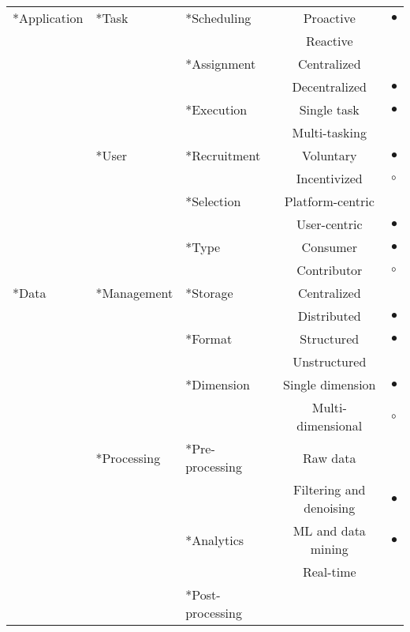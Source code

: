 \begin{table}[htbp]
\renewcommand{\arraystretch}{0.85}
\scriptsize
\centering
\begin{tabularx}{\textwidth}{
    >{\centering\arraybackslash}X
    >{\centering\arraybackslash}X
    >{\centering\arraybackslash}X
    c
    >{\centering\arraybackslash}X}
\toprule
\multirow{12}*{Application}
	& \multirow{6}*{Task}
		& \multirow{2}*{Scheduling}
			& Proactive & $\bullet$ \\
			&&& Reactive & \\
		\cmidrule{3-5}
		&& \multirow{2}*{Assignment}
			& Centralized & \\
			&&& Decentralized & $\bullet$ \\
		\cmidrule{3-5}
		&& \multirow{2}*{Execution}
			& Single task & $\bullet$ \\
			&&& Multi-tasking & \\
	\cmidrule{2-5}
	& \multirow{6}*{User}
		& \multirow{2}*{Recruitment}
			& Voluntary & $\bullet$ \\
			&&& Incentivized & $\circ$ \\
		\cmidrule{3-5}
		&& \multirow{2}*{Selection}
			& Platform-centric & \\
			&&& User-centric & $\bullet$ \\
		\cmidrule{3-5}
		&& \multirow{2}*{Type}
			& Consumer & $\bullet$ \\
			&&& Contributor & $\circ$ \\
		\cmidrule{2-5}
\cmidrule{1-5}
\multirow{12}*{Data}
	& \multirow{6}*{Management}
		& \multirow{2}*{Storage}
			& Centralized & \\
			&&& Distributed & $\bullet$ \\
		\cmidrule{3-5}
		&& \multirow{2}*{Format}
			& Structured & $\bullet$ \\
			&&& Unstructured & \\
		\cmidrule{3-5}
		&& \multirow{2}*{Dimension}
			& Single dimension & $\bullet$ \\
			&&& Multi-dimensional & $\circ$ \\
	\cmidrule{2-5}
	& \multirow{6}*{Processing}
		& \multirow{2}*{Pre-processing}
			& Raw data & \\
			&&& Filtering and denoising & $\bullet$ \\
		\cmidrule{3-5}
		&& \multirow{2}*{Analytics}
			& ML and data mining & $\bullet$ \\
			&&& Real-time & \\
		\cmidrule{3-5}
		&& \multirow{2}*{Post-processing}

\end{tabularx}
\end{table}
